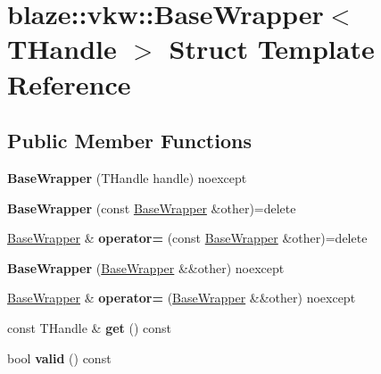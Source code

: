\hypertarget{structblaze_1_1vkw_1_1BaseWrapper}{}\section{blaze\+:\+:vkw\+:\+:Base\+Wrapper$<$ T\+Handle $>$ Struct Template Reference}
\label{structblaze_1_1vkw_1_1BaseWrapper}
\subsection*{Public Member Functions}
\begin{DoxyCompactItemize}
\item 
\mbox{\label{structblaze_1_1vkw_1_1BaseWrapper_a803e44ff43aee1bafc4ab8a8dd38c045}} 
{\bfseries Base\+Wrapper} (T\+Handle handle) noexcept
\item 
\mbox{\label{structblaze_1_1vkw_1_1BaseWrapper_ab455241b49f1dbb4de62576b24830724}} 
{\bfseries Base\+Wrapper} (const \hyperlink{structblaze_1_1vkw_1_1BaseWrapper}{Base\+Wrapper} \&other)=delete
\item 
\mbox{\label{structblaze_1_1vkw_1_1BaseWrapper_ac5e6e6401d33e076cc397a6e01e8ec9d}} 
\hyperlink{structblaze_1_1vkw_1_1BaseWrapper}{Base\+Wrapper} \& {\bfseries operator=} (const \hyperlink{structblaze_1_1vkw_1_1BaseWrapper}{Base\+Wrapper} \&other)=delete
\item 
\mbox{\label{structblaze_1_1vkw_1_1BaseWrapper_a2129f6760488d97394f43463a1ed1e40}} 
{\bfseries Base\+Wrapper} (\hyperlink{structblaze_1_1vkw_1_1BaseWrapper}{Base\+Wrapper} \&\&other) noexcept
\item 
\mbox{\label{structblaze_1_1vkw_1_1BaseWrapper_a1910791990dc8fc6ca1af820ff165a85}} 
\hyperlink{structblaze_1_1vkw_1_1BaseWrapper}{Base\+Wrapper} \& {\bfseries operator=} (\hyperlink{structblaze_1_1vkw_1_1BaseWrapper}{Base\+Wrapper} \&\&other) noexcept
\item 
\mbox{\label{structblaze_1_1vkw_1_1BaseWrapper_ae4cc5b70a70e3f874e78560bd56965c9}} 
const T\+Handle \& {\bfseries get} () const
\item 
\mbox{\label{structblaze_1_1vkw_1_1BaseWrapper_ada87c8ddce10d53baf9d4311ce2c543c}} 
bool {\bfseries valid} () const
\end{DoxyCompactItemize}
